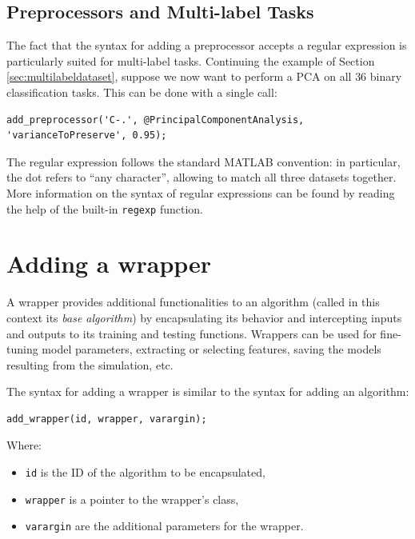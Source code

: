 \subsection{Preprocessors and Multi-label Tasks}

The fact that the syntax for adding a preprocessor accepts a regular expression is particularly suited for multi-label tasks. Continuing the example of Section \ref{sec:multilabeldataset}, suppose we now want to perform a PCA on all $36$ binary classification tasks. This can be done with a single call:

\begin{lstlisting}
add_preprocessor('C-.', @PrincipalComponentAnalysis, 'varianceToPreserve', 0.95);
\end{lstlisting}

\noindent The regular expression follows the standard MATLAB convention: in particular, the dot refers to ``any character'', allowing to match all three datasets together. More information on the syntax of regular expressions can be found by reading the help of the built-in \verb|regexp| function.

\section{Adding a wrapper}

A wrapper provides additional functionalities to an algorithm (called in this context its \textit{base algorithm}) by encapsulating its behavior and intercepting inputs and outputs to its training and testing functions. Wrappers can be used for fine-tuning model parameters, extracting or selecting features, saving the models resulting from the simulation, etc.

The syntax for adding a wrapper is similar to the syntax for adding an algorithm:

\begin{lstlisting}
add_wrapper(id, wrapper, varargin);
\end{lstlisting}

\noindent Where:

\begin{itemize}
\item \verb|id| is the ID of the algorithm to be encapsulated,
\item \verb|wrapper| is a pointer to the wrapper’s class,
\item \verb|varargin| are the additional parameters for the wrapper.
\end{itemize}

